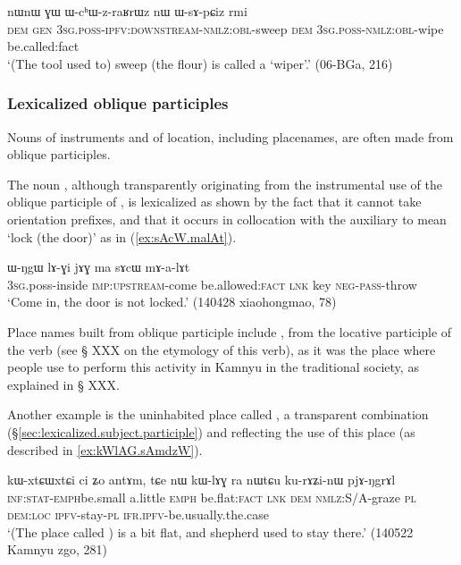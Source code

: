 \begin{exe}
\ex \label{ex:WchWzraRWz}
\gll  nɯnɯ ɣɯ ɯ-cʰɯ-z-raʁrɯz nɯ ɯ-sɤ-pɕiz rmi \\ 
\textsc{dem} \textsc{gen} \textsc{3sg}.\textsc{poss}-\textsc{ipfv}:\textsc{downstream}-\textsc{nmlz}:\textsc{obl}-sweep \textsc{dem}  \textsc{3sg}.\textsc{poss}-\textsc{nmlz}:\textsc{obl}-wipe be.called:fact \\
\glt `(The tool used to) sweep (the flour) is called a `wiper'.' (06-BGa, 216)
\end{exe}

\subsubsection{Lexicalized oblique participles} \label{sec:lexicalized.oblique.participle}
Nouns of instruments and of location, including placenames, are often made from oblique participles. 

The noun , although transparently originating from the instrumental use of the oblique participle of , is lexicalized as shown by the fact that it cannot take orientation prefixes, and that it occurs in collocation with the auxiliary  to mean `lock (the door)' as in (\ref{ex:sAcW.malAt}).

\begin{exe}
\ex \label{ex:sAcW.malAt}
\gll   ɯ-ŋgɯ lɤ-ɣi jɤɣ ma sɤcɯ mɤ-a-lɤt \\
\textsc{3sg}.poss-inside \textsc{imp}:\textsc{upstream}-come be.allowed:\textsc{fact} \textsc{lnk} key \textsc{neg}-\textsc{pass}-throw \\
\glt `Come in, the door is not locked.' (140428 xiaohongmao, 78)
\end{exe}

Place names built from oblique participle include , from the locative participle  of the verb  (see § XXX on the etymology of this verb), as it was the place where people use to perform this activity in Kamnyu in the traditional society, as explained in § XXX.

Another example is the uninhabited place called , a transparent combination   (§\ref{sec:lexicalized.subject.participle}) and  reflecting the use of this place (as described in \ref{ex:kWlAG.sAmdzW}).

\begin{exe}
\ex \label{ex:kWlAG.sAmdzW}
\gll    kɯ-xtɕɯ\redp{}xtɕi ci ʑo antɤm, tɕe nɯ kɯ-lɤɣ ra nɯtɕu ku-rɤʑi-nɯ pjɤ-ŋgrɤl \\
\textsc{inf}:\textsc{stat}-\textsc{emph}\redp{}be.small a.little \textsc{emph} be.flat:\textsc{fact}  \textsc{lnk} \textsc{dem} \textsc{nmlz}:S/A-graze \textsc{pl} \textsc{dem}:\textsc{loc} \textsc{ipfv}-stay-\textsc{pl} \textsc{ifr}.\textsc{ipfv}-be.usually.the.case \\
\glt `(The place called ) is a bit flat, and shepherd used to stay there.' (140522 Kamnyu zgo, 281)
 \end{exe}
 
